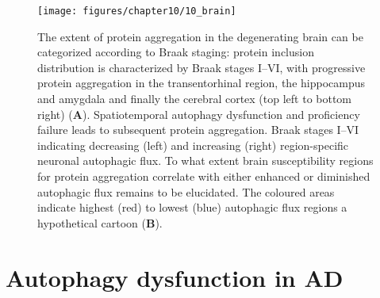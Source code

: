 \begin{figure}[!htbp]
  \center
  \texttt{[image: figures/chapter10/10\_brain]}
  \caption[Protein aggregation categorized according to Braak staging]{The extent of protein aggregation in the degenerating brain can be categorized according to Braak staging: protein inclusion distribution is characterized by Braak stages I–VI, with progressive protein aggregation in the transentorhinal region, the hippocampus and amygdala and finally the cerebral cortex (top left to bottom right) (\textbf{A}). Spatiotemporal autophagy dysfunction and proficiency failure leads to subsequent protein aggregation. Braak stages I–VI indicating decreasing (left) and increasing (right) region-specific neuronal autophagic flux. To what extent brain susceptibility regions for protein aggregation correlate with either enhanced or diminished autophagic flux remains to be elucidated. The coloured areas indicate highest (red) to lowest (blue) autophagic flux regions a hypothetical cartoon (\textbf{B}).}
  \label{fig:10_brain}
\end{figure}

\section{Autophagy dysfunction in AD}
